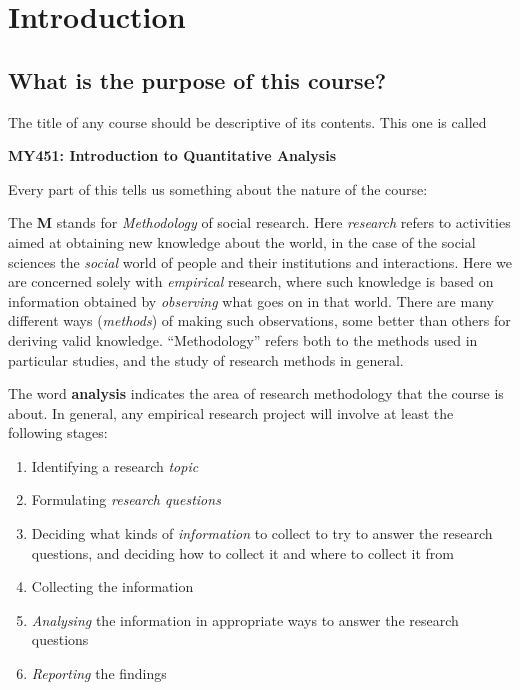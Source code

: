 \chapter{Introduction}
\label{c_intro}

\vspace*{-2.5ex}
\section{What is the purpose of this course?}
\label{s_intro_purpose}

The title of any course should be descriptive of its contents.
This one is called
\begin{center}
\textbf{MY451: Introduction to Quantitative Analysis}
\end{center}
Every part of this tells us something about the nature of the
course:

The \textbf{M} stands for \emph{Methodology} of social research. Here
\emph{research} refers to activities aimed at obtaining new knowledge
about the world, in the case of the social sciences the \emph{social}
world of people and their institutions and interactions. Here we are
concerned solely with \emph{empirical} research, where such knowledge is
based on information obtained by \emph{observing} what goes on in that
world. There are many different ways (\emph{methods}) of making such
observations, some better than others for deriving valid knowledge.
``Methodology'' refers both to the methods used in particular studies,
and the study of research methods in general.

The word \textbf{analysis} indicates the area of research methodology
that the course is about. In general, any empirical research project
will involve at least the following stages:
\begin{enumerate}
\item
Identifying a research \emph{topic}
\item
Formulating \emph{research questions}
\item
Deciding what kinds of \emph{information} to collect to try to answer the
research questions, and deciding how to collect it and where to collect
it from
\item
Collecting the information
\item
\emph{Analysing} the information in appropriate ways to answer the
research questions
\item
\emph{Reporting} the findings
\end{enumerate}

